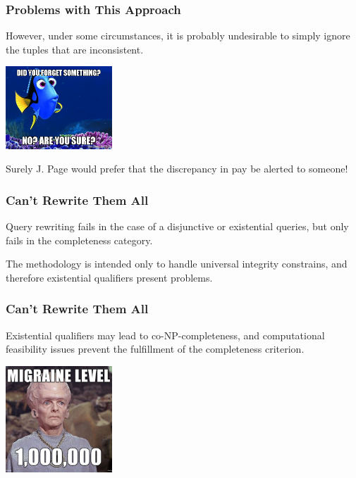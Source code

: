 \begin{frame}
\frametitle{Problems with This Approach}

However, under some circumstances, it is probably undesirable to simply ignore the tuples that are inconsistent. 

\begin{center}
	\includegraphics[width=0.3\textwidth]{images/forgetting.jpg}
\end{center}

Surely J. Page would prefer that the discrepancy in pay be alerted to someone!


\end{frame}

\begin{frame}
\frametitle{Can't Rewrite Them All}

Query rewriting fails in the case of a disjunctive or existential queries, but only fails in the completeness category. 

The methodology is intended only to handle universal integrity constrains, and therefore existential qualifiers present problems. 


\end{frame}

\begin{frame}
\frametitle{Can't Rewrite Them All}

Existential qualifiers may lead to co-NP-completeness, and computational feasibility issues prevent the fulfillment of the completeness criterion. 

\begin{center}
	\includegraphics[width=0.3\textwidth]{images/migraine.jpg}
\end{center}


\end{frame}



